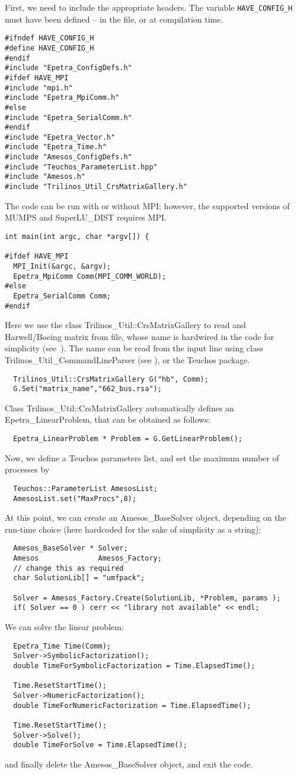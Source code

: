 \documentclass[11pt]{SANDreport}
\begin{document}
First, we need to include the appropriate headers. The variable
\verb!HAVE_CONFIG_H! must have been defined -- in the file, or at
compilation time. 
\begin{verbatim}
#ifndef HAVE_CONFIG_H
#define HAVE_CONFIG_H
#endif
#include "Epetra_ConfigDefs.h"
#ifdef HAVE_MPI
#include "mpi.h"
#include "Epetra_MpiComm.h"
#else
#include "Epetra_SerialComm.h"
#endif
#include "Epetra_Vector.h"
#include "Epetra_Time.h"
#include "Amesos_ConfigDefs.h"
#include "Teuchos_ParameterList.hpp"
#include "Amesos.h"
#include "Trilinos_Util_CrsMatrixGallery.h"
\end{verbatim}
The code can be run with or without MPI; however, the supported versions
of MUMPS and SuperLU\_DIST requires MPI.
\begin{verbatim}
int main(int argc, char *argv[]) {

#ifdef HAVE_MPI
  MPI_Init(&argc, &argv);
  Epetra_MpiComm Comm(MPI_COMM_WORLD);
#else
  Epetra_SerialComm Comm;
#endif
\end{verbatim}
Here we use the class Trilinos\_Util::CrsMatrixGallery to read and
Harwell/Boeing matrix from file, whose name is hardwired in the code for
simplicity (see~\cite[Chap 5]{Trilinos-tutorial}). The name can be read from the
input line using class Trilinos\_Util\_CommandLineParser (see
\cite{Trilinos-tutorial}), or the Teuchos package.
\begin{verbatim}
  Trilinos_Util::CrsMatrixGallery G("hb", Comm);
  G.Set("matrix_name","662_bus.rsa");
\end{verbatim}
Class Trilinos\_Util::CrsMatrixGallery automatically defines an
Epetra\_LinearProblem, that can be obtained as follows:
\begin{verbatim}  
  Epetra_LinearProblem * Problem = G.GetLinearProblem();
\end{verbatim}
Now, we define a Teuchos parameters list, and set the maximum number of
processes by
\begin{verbatim}  
  Teuchos::ParameterList AmesosList;
  AmesosList.set("MaxProcs",8);
\end{verbatim}
At this point, we can create an Amesos\_BaseSolver object, depending on
the run-time choice (here hardcoded for the sake of simplicity as a
string):
\begin{verbatim}  
  Amesos_BaseSolver * Solver;
  Amesos              Amesos_Factory;
  // change this as required
  char SolutionLib[] = "umfpack";

  Solver = Amesos_Factory.Create(SolutionLib, *Problem, params );
  if( Solver == 0 ) cerr << "library not available" << endl;
\end{verbatim}
We can solve the linear problem:
\begin{verbatim}  
  Epetra_Time Time(Comm);      
  Solver->SymbolicFactorization();
  double TimeForSymbolicFactorization = Time.ElapsedTime();
  
  Time.ResetStartTime();  
  Solver->NumericFactorization();
  double TimeForNumericFactorization = Time.ElapsedTime();
   
  Time.ResetStartTime();
  Solver->Solve();
  double TimeForSolve = Time.ElapsedTime();
\end{verbatim}
and finally delete the Amesos\_BaseSolver object, and exit the code.
\end{document}
